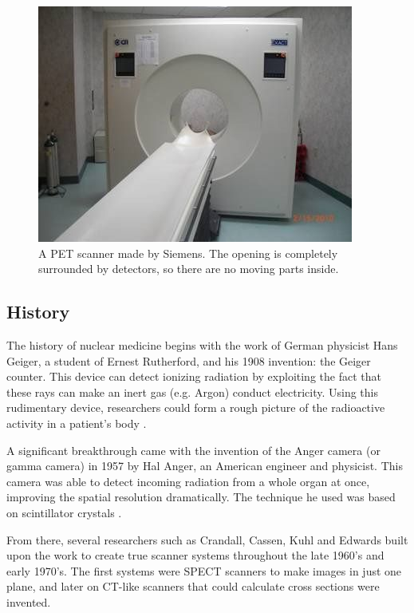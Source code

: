 \begin{figure}[ht]
\begin{center}
  \includegraphics[width=\linewidth]{img/petscanner.jpg}
  \caption{A PET scanner made by Siemens. The opening is completely surrounded
  by detectors, so there are no moving parts inside.}
  \label{fig:petscanner}
\end{center}
\end{figure}

\subsection{History}
The history of nuclear medicine begins with the work of German physicist Hans
Geiger, a student of Ernest Rutherford, and his 1908 invention: the Geiger
counter. This device can detect ionizing radiation by exploiting the fact that
these rays can make an inert gas (e.g. Argon) conduct electricity. Using
this rudimentary device, researchers could form a rough picture of the radioactive
activity in a patient's body \cite{specthistory, geigercountertube}.

A significant breakthrough came with the invention of the Anger camera (or
gamma camera) in 1957 by Hal Anger, an American engineer and physicist. This
camera was able to detect incoming radiation from a whole organ at once,
improving the spatial resolution dramatically. The technique he used was based
on scintillator crystals \cite{anger}.

From there, several researchers such as Crandall, Cassen, Kuhl and Edwards built
upon the work to create true scanner systems throughout the late 1960's and
early 1970's. The first systems were SPECT scanners to make images in just one
plane, and later on CT-like scanners that could calculate cross sections were
invented.

